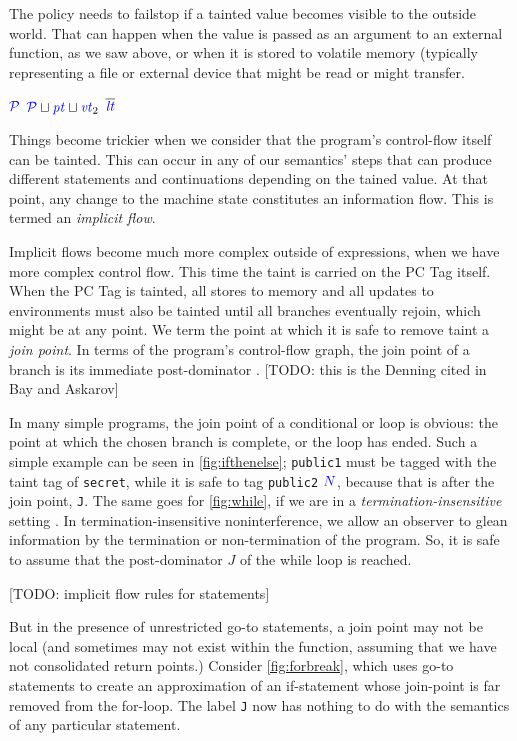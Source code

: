 \documentclass{llncs}
\begin{document}
The policy needs to failstop if a tainted value becomes visible to the outside world.
That can happen when the value is passed as an argument to an external function, as we
saw above, or when it is stored to volatile memory (typically representing a file or external
device that might be read or might transfer.

  
                {\(\mathcal{\color{blue} P}\)}
                {\(\mathcal{\color{blue} P} \sqcup \mathit{\color{blue} pt} \sqcup \mathit{\color{blue} vt}_2\)}
                {\(\overline{\color{blue} \mathit{\color{blue} lt}}\)}

Things become trickier when we consider that the program's control-flow itself can be tainted.
This can occur in any of our semantics' steps that can produce different statements and continuations
depending on the tained value. At that point, any change to the machine state constitutes
an information flow. This is termed an {\em implicit flow}.

Implicit flows become much more complex outside of expressions, when we have more
complex control flow. This time the taint is carried on the PC Tag itself.
When the PC Tag is tainted, all stores to memory and all updates to environments must
also be tainted until all branches eventually rejoin, which might be at any point.
We term the point at which it is safe to remove taint a {\it join point}.
In terms of the program's control-flow graph, the
join point of a branch is its immediate post-dominator \cite{}.
[TODO: this is the Denning cited in Bay and Askarov]

In many simple programs, the join point of a conditional or loop is obvious:
the point at which the chosen branch is complete, or the loop has ended.
Such a simple example can be seen in \cref{fig:ifthenelse}; {\tt public1} must be
tagged with the taint tag of {\tt secret}, while it is safe to tag {\tt public2}
\({\color{blue} N}\), because that is after the join point, {\tt J}. The same goes for \cref{fig:while},
if we are in a {\em termination-insensitive} setting \cite{Askarov08:TINILeaks}.
In termination-insensitive noninterference, we allow
an observer to glean information by the termination or non-termination of
the program. So, it is safe to assume that the post-dominator \(J\)
of the while loop is reached.

[TODO: implicit flow rules for statements]

But in the presence of unrestricted go-to statements, a join point may not be
local (and sometimes may not exist within the function, assuming that we have not
consolidated return points.) Consider \cref{fig:forbreak}, which
uses go-to statements to create an approximation of an if-statement whose join-point
is far removed from the for-loop. The label {\tt J} now has nothing to do with the
semantics of any particular statement.
\end{document}

